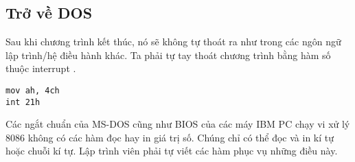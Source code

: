 \documentclass[main.tex]{subfiles}
\begin{document}
\subsection*{Trở về DOS}
Sau khi chương trình kết thúc, nó sẽ không tự thoát ra như trong các ngôn ngữ lập trình/hệ điều hành khác. Ta phải tự tay thoát chương trình bằng hàm số  thuộc interrupt .
\begin{verbatim}
mov ah, 4ch
int 21h
\end{verbatim}

Các ngắt chuẩn của MS-DOS cũng như BIOS của các máy IBM PC chạy vi xử lý 8086 không có các hàm đọc hay in giá trị số. Chúng chỉ có thể đọc và in kí tự hoặc chuỗi kí tự. Lập trình viên phải tự viết các hàm phục vụ những điều này.
\end{document}
